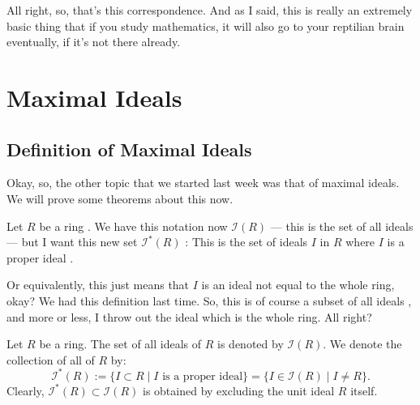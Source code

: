 \begin{speech}[00:09:12 - 00:09:28]
All right, so, that's this correspondence. And as I said, this is really an extremely basic thing that if you study mathematics, it will also go to your reptilian brain eventually, if it's not there already. 
\end{speech}

\section{Maximal Ideals}

\subsection{Definition of Maximal Ideals}

\begin{speech}[00:10:11 - 00:11:04]
Okay, so, the other topic that we started last week was that of maximal ideals. We will prove some theorems about this now.

Let $R$ be a ring . We have this notation now $\mathscr{I}(R)$ --- this is the set of all ideals --- but I want this new set $\mathscr{I}^*(R)$ : This is the set of ideals $I$ in $R$ where $I$ is a proper ideal .

Or equivalently, this just means that $I$ is an ideal not equal to the whole ring, okay?  We had this definition last time. So, this is of course a subset of all ideals , and more or less, I throw out the ideal which is the whole ring. All right?
\end{speech}

\begin{content}
Let $R$ be a ring. The set of all ideals of $R$ is denoted by $\mathscr{I}(R)$. We denote the collection of all  of $R$ by:
\begin{equation}\label{eq:proper-ideals-def}
\mathscr{I}^*(R) := \{ I \subset R \mid I \text{ is a proper ideal} \} = \{ I \in \mathscr{I}(R) \mid I \neq R \}.
\end{equation}
Clearly, $\mathscr{I}^*(R) \subset \mathscr{I}(R)$ is obtained by excluding the unit ideal $R$ itself.
\end{content}

